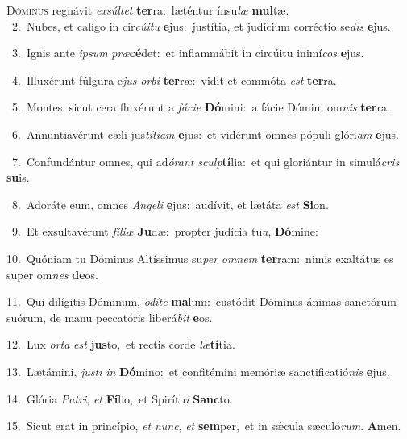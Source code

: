\lettrine{\initial\textcolor{\initialcolor}{D}}{óminus} regnávit \textit{ex}\-\textit{súl}\textit{tet} \textbf{ter}\-ra:~\star læténtur ínsu\textit{læ} \textbf{mul}\-tæ.\\
{\numbfont\textcolor{\numbcolor}{~2.}}~Nubes, et calígo in cir\-\textit{cú}\-\textit{i}\textit{tu} \textbf{e}\-jus:~\star justítia, et judícium corréctio se\textit{dis} \textbf{e}\-jus.\par
{\numbfont\textcolor{\numbcolor}{~3.}}~Ignis ante \textit{ip}\-\textit{sum} \textit{præ}\-\textbf{cé}det:~\star et inflammábit in circúitu inimí\textit{cos} \textbf{e}\-jus.\par
{\numbfont\textcolor{\numbcolor}{~4.}}~Illuxérunt fúlgura e\textit{jus} \textit{or}\-\textit{bi} \textbf{ter}\-ræ:~\star vidit et commóta \textit{est} \textbf{ter}\-ra.\par
{\numbfont\textcolor{\numbcolor}{~5.}}~Montes, sicut cera fluxérunt a \textit{fá}\-\textit{ci}\textit{e} \textbf{Dó}\-mini:~\star a fácie Dómini om\textit{nis} \textbf{ter}\-ra.\par
{\numbfont\textcolor{\numbcolor}{~6.}}~Annuntiavérunt cæli jus\-\textit{tí}\-\textit{ti}\textit{am} \textbf{e}\-jus:~\star et vidérunt omnes pópuli glóri\textit{am} \textbf{e}\-jus.\par
{\numbfont\textcolor{\numbcolor}{~7.}}~Confundántur omnes, qui ad\-\textit{ó}\-\textit{rant} \textit{sculp}\-\textbf{tí}lia:~\star et qui gloriántur in simulá\textit{cris} \textbf{su}\-is.\par
{\numbfont\textcolor{\numbcolor}{~8.}}~Adoráte eum, omnes \textit{An}\-\textit{ge}\textit{li} \textbf{e}\-jus:~\star audívit, et lætáta \textit{est} \textbf{Si}\-on.\par
{\numbfont\textcolor{\numbcolor}{~9.}}~Et exsultavérunt \textit{fí}\-\textit{li}\textit{æ} \textbf{Ju}\-dæ:~\star propter judícia tu\-\textit{a}\-, \textbf{Dó}\-mine:\par
{\numbfont\textcolor{\numbcolor}{10.}}~Quóniam tu Dóminus Altíssimus su\textit{per} \textit{om}\-\textit{nem} \textbf{ter}\-ram:~\star nimis exaltátus es super om\textit{nes} \textbf{de}\-os.\par
{\numbfont\textcolor{\numbcolor}{11.}}~Qui dilígitis Dóminum, \textit{o}\-\textit{dí}\textit{te} \textbf{ma}\-lum:~\star custódit Dóminus ánimas sanctórum suórum, de manu peccatóris liberá\textit{bit} \textbf{e}\-os.\par
{\numbfont\textcolor{\numbcolor}{12.}}~Lux \textit{or}\-\textit{ta} \textit{est} \textbf{jus}\-to,~\star et rectis corde \textit{læ}\-\textbf{tí}tia.\par
{\numbfont\textcolor{\numbcolor}{13.}}~Lætámini, \textit{jus}\-\textit{ti} \textit{in} \textbf{Dó}\-mino:~\star et confitémini memóriæ sanctificatió\textit{nis} \textbf{e}\-jus.\par
{\numbfont\textcolor{\numbcolor}{14.}}~Glória \textit{Pa}\-\textit{tri}, \textit{et} \textbf{Fí}\-lio,~\star et Spirítu\textit{i} \textbf{Sanc}\-to.\par
{\numbfont\textcolor{\numbcolor}{15.}}~Sicut erat in princípio, \textit{et} \textit{nunc}\-, \textit{et} \textbf{sem}\-per,~\star et in sǽcula sæculó\-\textit{rum}\-. \textbf{A}\-men.\par
